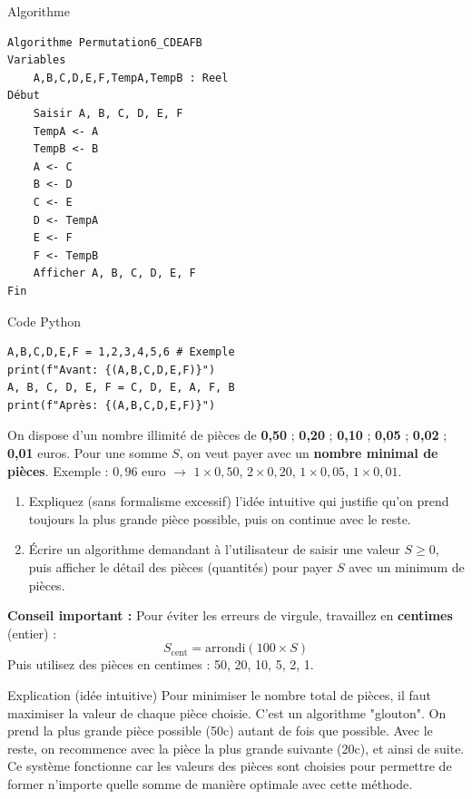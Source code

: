 \documentclass[12pt,a4paper]{article}
\begin{document}
\begin{ansbox}{Algorithme}
\begin{verbatim}
Algorithme Permutation6_CDEAFB
Variables
    A,B,C,D,E,F,TempA,TempB : Reel
Début
    Saisir A, B, C, D, E, F
    TempA <- A
    TempB <- B
    A <- C
    B <- D
    C <- E
    D <- TempA
    E <- F
    F <- TempB
    Afficher A, B, C, D, E, F
Fin
\end{verbatim}
\end{ansbox}

\begin{ansbox}{Code Python}
\begin{verbatim}
A,B,C,D,E,F = 1,2,3,4,5,6 # Exemple
print(f"Avant: {(A,B,C,D,E,F)}")
A, B, C, D, E, F = C, D, E, A, F, B
print(f"Après: {(A,B,C,D,E,F)}")
\end{verbatim}
\end{ansbox}
\clearpage

\begin{exobox}[title=\textbf{Exercice 10 — Pièces de monnaie (rendu de monnaie)}]
On dispose d’un nombre illimité de pièces de \textbf{0,50} ; \textbf{0,20} ; \textbf{0,10} ; \textbf{0,05} ; \textbf{0,02} ; \textbf{0,01} euros.
Pour une somme $S$, on veut payer avec un \textbf{nombre minimal de pièces}.
Exemple : $0{,}96$ euro $\rightarrow$ $1\times 0{,}50$, $2\times 0{,}20$, $1\times 0{,}05$, $1\times 0{,}01$.
\end{exobox}

\begin{taskbox}
\begin{enumerate}
  \item Expliquez (sans formalisme excessif) l’idée intuitive qui justifie qu’on prend toujours la plus grande pièce possible, puis on continue avec le reste.
  \item Écrire un algorithme demandant à l’utilisateur de saisir une valeur $S \ge 0$, puis afficher le détail des pièces (quantités) pour payer $S$ avec un minimum de pièces.
\end{enumerate}

\textbf{Conseil important :} Pour éviter les erreurs de virgule, travaillez en \textbf{centimes} (entier) :
\[
S_{\text{cent}} = \text{arrondi}(100 \times S)
\]
Puis utilisez des pièces en centimes : 50, 20, 10, 5, 2, 1.
\end{taskbox}

\begin{ansbox}{Explication (idée intuitive)}
Pour minimiser le nombre total de pièces, il faut maximiser la valeur de chaque pièce choisie. C’est un algorithme "glouton". On prend la plus grande pièce possible (50c) autant de fois que possible. Avec le reste, on recommence avec la pièce la plus grande suivante (20c), et ainsi de suite. Ce système fonctionne car les valeurs des pièces sont choisies pour permettre de former n’importe quelle somme de manière optimale avec cette méthode.
\end{ansbox}
\end{document}
